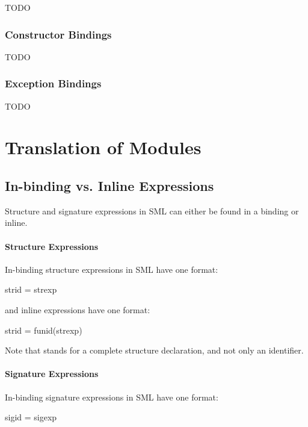 \documentclass[a4paper,11pt]{article}
\begin{document}
TODO

\subsubsection{Constructor Bindings}

TODO

\subsubsection{Exception Bindings}

TODO
\newpage

\section{Translation of Modules}

\subsection{In-binding vs. Inline Expressions}

Structure and signature expressions in SML can either be found in a binding or
inline. 

\paragraph{Structure Expressions}

In-binding structure expressions in SML have one format:

\begin{sml}
strid  = strexp
\end{sml}

\noindent
and inline expressions have one format:

\begin{sml}
strid = funid(strexp)
\end{sml}

\noindent
Note that  stands for a complete structure declaration,
and not only an identifier.


\paragraph{Signature Expressions}

In-binding signature expressions in SML have one format:

\begin{sml}
sigid  = sigexp
\end{sml}
\end{document}
